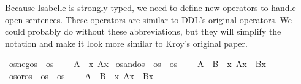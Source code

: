 \begin{isabellebody}
\begin{isamarkuptext}
Because Isabelle is strongly typed, we need to define new operators to handle open sentences. These operators 
are similar to DDL's original operators. We could probably do without these abbreviations, but they will 
simplify the notation and make it look more similar to Kroy's original paper.%
\end{isamarkuptext}\isamarkuptrue%
\isamarkupfalse%
\ os{\isacharunderscore}neg{\isacharcolon}{\isacharcolon}{\isachardoublequoteopen}os\ {\isasymRightarrow}\ os{\isachardoublequoteclose}\ {\isacharparenleft}{\isachardoublequoteopen}\isactrlemph {\isasymnot}{\isacharunderscore}{\isachardoublequoteclose}{\isacharparenright}\isanewline
\ \ \ {\isachardoublequoteopen}{\isacharparenleft}\isactrlemph {\isasymnot}A{\isacharparenright}\ {\isasymequiv}\ {\isasymlambda}x{\isachardot}\ \isactrlbold {\isasymnot}{\isacharparenleft}A{\isacharparenleft}x{\isacharparenright}{\isacharparenright}{\isachardoublequoteclose}\isanewline
{}\isamarkupfalse%
\ os{\isacharunderscore}and{\isacharcolon}{\isacharcolon}{\isachardoublequoteopen}os\ {\isasymRightarrow}\ os\ {\isasymRightarrow}\ os{\isachardoublequoteclose}\ {\isacharparenleft}{\isachardoublequoteopen}{\isacharunderscore}\isactrlemph {\isasymand}{\isacharunderscore}{\isachardoublequoteclose}{\isacharparenright}\isanewline
\ \ \ {\isachardoublequoteopen}{\isacharparenleft}A\ \isactrlemph {\isasymand}\ B{\isacharparenright}\ {\isasymequiv}\ {\isasymlambda}x{\isachardot}\ {\isacharparenleft}{\isacharparenleft}A{\isacharparenleft}x{\isacharparenright}{\isacharparenright}\ \isactrlbold {\isasymand}\ {\isacharparenleft}B{\isacharparenleft}x{\isacharparenright}{\isacharparenright}{\isacharparenright}{\isachardoublequoteclose}\isanewline
{}\isamarkupfalse%
\ os{\isacharunderscore}or{\isacharcolon}{\isacharcolon}{\isachardoublequoteopen}os\ {\isasymRightarrow}\ os\ {\isasymRightarrow}\ os{\isachardoublequoteclose}\ {\isacharparenleft}{\isachardoublequoteopen}{\isacharunderscore}\isactrlemph {\isasymor}{\isacharunderscore}{\isachardoublequoteclose}{\isacharparenright}\isanewline
\ \ \ {\isachardoublequoteopen}{\isacharparenleft}A\ \isactrlemph {\isasymor}\ B{\isacharparenright}\ {\isasymequiv}\ {\isasymlambda}x{\isachardot}\ {\isacharparenleft}{\isacharparenleft}A{\isacharparenleft}x{\isacharparenright}{\isacharparenright}\ \isactrlbold {\isasymor}\ {\isacharparenleft}B{\isacharparenleft}x{\isacharparenright}{\isacharparenright}{\isacharparenright}{\isachardoublequoteclose}\isanewline

\end{isabellebody}
